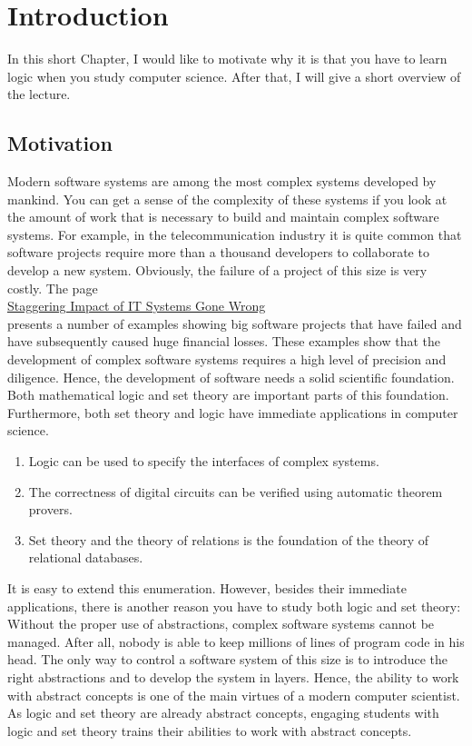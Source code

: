 \chapter{Introduction}
In this short Chapter, I would like to motivate why it is that you have to learn logic when you study computer
science.  After that, I will give a short overview of the lecture.

\section{Motivation}
Modern software systems are among the most complex systems developed by mankind.  You can get a
sense of the complexity of these systems if you look at the amount of work that is necessary to
build and maintain complex software systems.  For example, in the telecommunication industry it is 
quite common that software projects require more than a thousand developers to collaborate to
develop a new system.  Obviously, the failure of a project of this size is very costly.
The page
\\[0.2cm]
\hspace*{1.3cm}
\href{http://spectrum.ieee.org/static/the-staggering-impact-of-it-systems-gone-wrong}{Staggering Impact of IT Systems Gone Wrong}
\\[0.2cm]
presents a number of examples showing big software projects that have failed and have subsequently caused huge
financial losses.  These examples show that the development of complex software systems requires a high level
of precision and diligence.  Hence, the development of software needs a solid scientific
foundation.  Both mathematical logic and set theory are important parts of this foundation.
Furthermore, both set theory and logic have immediate applications in computer science.
\begin{enumerate}
\item Logic can be used to specify the interfaces of complex systems.  
\item The correctness of digital circuits can be verified using automatic theorem provers.
\item Set theory and the theory of relations is the foundation of the theory of relational databases.
\end{enumerate}
It is easy to extend this enumeration.  However, besides their immediate applications, 
there is another reason you have to study both logic and set theory: Without the proper use of
{\color{blue}abstractions}, complex software systems cannot be managed.  After all, nobody is able to keep
millions of lines of program code in his head.  The only way to control a software system of this
size is to introduce the right abstractions and to develop the system in layers.  Hence, the ability
to work with abstract concepts is one of the main virtues of a modern computer scientist.  As logic
and set theory are already abstract concepts, engaging students with logic and set theory trains
their abilities to work with abstract concepts.

